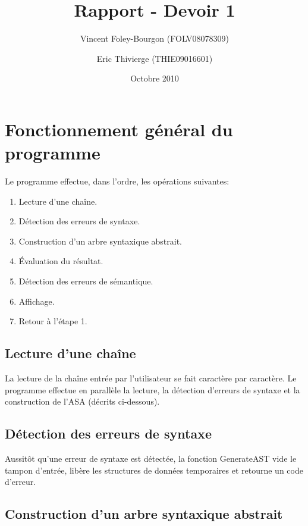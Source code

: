 \documentclass[10pt]{report}
\begin{document}
\title{Rapport - Devoir 1}
\date{Octobre 2010}
\author{Vincent Foley-Bourgon (FOLV08078309) \and
  Eric Thivierge (THIE09016601)}

\maketitle

\section{Fonctionnement général du programme}

Le programme effectue, dans l'ordre, les opérations suivantes:

\begin{enumerate}
  \item Lecture d'une chaîne.
  \item Détection des erreurs de syntaxe.
  \item Construction d'un arbre syntaxique abstrait.
  \item Évaluation du résultat.
  \item Détection des erreurs de sémantique.
  \item Affichage.
  \item Retour à l'étape 1.
\end{enumerate}


\subsection{Lecture d'une chaîne}

La lecture de la chaîne entrée par l'utilisateur se fait caractère par
caractère.  Le programme effectue en parallèle la lecture, la détection
d'erreurs de syntaxe et la construction de l'ASA (décrits ci-dessous).

\subsection{Détection des erreurs de syntaxe}

Aussitôt qu'une erreur de syntaxe est détectée, la fonction GenerateAST vide
le tampon d'entrée, libère les structures de données temporaires et retourne
un code d'erreur.

\subsection{Construction d'un arbre syntaxique abstrait}
\end{document}
